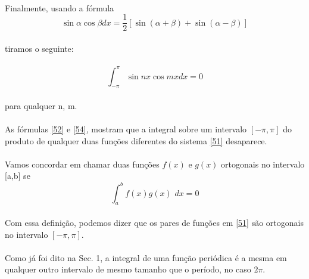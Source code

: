 \documentclass{article}
\begin{document}
\\
Finalmente, usando a fórmula \\
\begin{equation}
        \sin{\alpha}\cos{\beta} dx = \dfrac{1}{2}[\sin{(\alpha + \beta)} + \sin{(\alpha - \beta)}]    
\end{equation}
\\
tiramos o seguinte:\\
\\
\begin{equation}
\label{55}
    \int_{-\pi}^{\pi}\sin{nx}\cos{mx}dx = 0
\end{equation}
\\
para qualquer n, m.\\
\\
As fórmulas \ref{52} e \ref{54}, mostram que a integral sobre um intervalo $[-\pi, \pi]$
do produto de qualquer duas funções diferentes do sistema \ref{51} desaparece.\\
\\
Vamos concordar em chamar duas funções $f(x)$ e $g(x)$ ortogonais no intervalo
[a,b] se\\
\begin{equation}
    \int_{a}^{b} f(x)g(x)\hspace{4pt}dx = 0
\end{equation}
\\
Com essa definição, podemos dizer que os pares de funções em \ref{51} são
ortogonais no intervalo $[-\pi, \pi]$.\\
\\
Como já foi dito na Sec. 1, a integral de uma função periódica é a mesma em
qualquer outro intervalo de mesmo tamanho que o período, no caso $2\pi$.\\
\\
\end{document}

